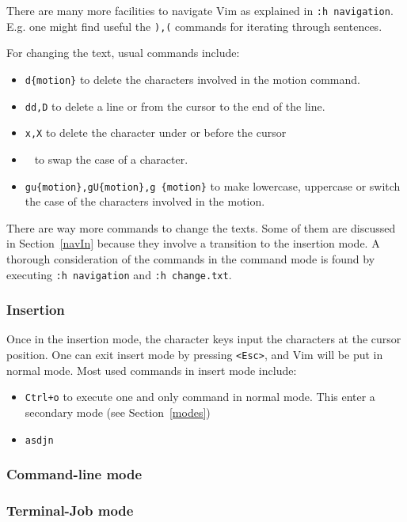 \documentclass{article}
\begin{document}
There are many more facilities to navigate Vim
as explained in \texttt{:h navigation}.
E.g. one might find useful the \texttt{),(} commands
for iterating through sentences.

For changing the text, usual commands include:
\begin{itemize}
  \item \texttt{d\{motion\}} to delete the characters
    involved in the motion command.
  \item \texttt{dd,D} to delete a line or from the cursor to the end of the line.
  \item \texttt{x,X} to delete the character under or before the cursor  \item \texttt{~} to swap the case of a character.
  \item \texttt{gu\{motion\},gU\{motion\},g~\{motion\}} to make lowercase, uppercase or switch the case of the characters involved in the motion.
\end{itemize}

There are way more commands to change the texts.
Some of them are discussed in Section~\ref{navIn}
because they involve a transition to the insertion mode.
A thorough consideration of the commands in the command mode
is found by executing \texttt{:h navigation} and 
\texttt{:h change.txt}.

\subsubsection{Insertion}
Once in the insertion mode, the character keys
input the characters at the cursor position.
One can exit insert mode by pressing \texttt{<Esc>},
and Vim will be put in normal mode.
Most used commands in insert mode include:
\begin{itemize}
  \item \texttt{Ctrl+o} to execute one and only command in normal mode.
	  This enter a secondary mode (see Section~\ref{modes})
  \item \texttt{asdjn}
\end{itemize}


\subsubsection{Command-line mode}

\subsubsection{Terminal-Job mode}\label{terminal}
\end{document}
